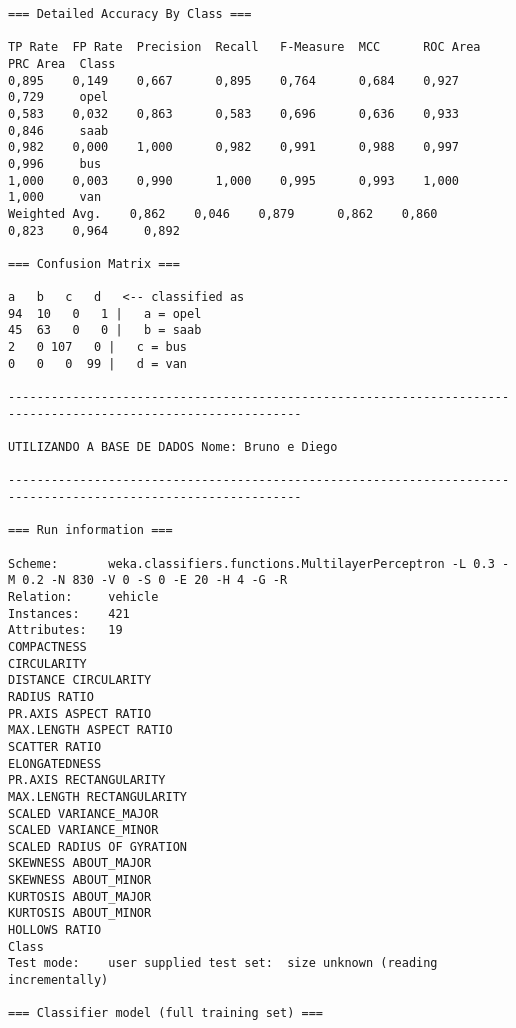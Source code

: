 \documentclass[
	article,			%
	11pt,				%
	oneside,			%
	a4paper,			%
	english,			%
	brazil,				%
	sumario=tradicional
	]{abntex2}
\begin{document}
\begin{lstlisting}
=== Detailed Accuracy By Class ===

TP Rate  FP Rate  Precision  Recall   F-Measure  MCC      ROC Area  PRC Area  Class
0,895    0,149    0,667      0,895    0,764      0,684    0,927     0,729     opel
0,583    0,032    0,863      0,583    0,696      0,636    0,933     0,846     saab
0,982    0,000    1,000      0,982    0,991      0,988    0,997     0,996     bus
1,000    0,003    0,990      1,000    0,995      0,993    1,000     1,000     van
Weighted Avg.    0,862    0,046    0,879      0,862    0,860      0,823    0,964     0,892     

=== Confusion Matrix ===

a   b   c   d   <-- classified as
94  10   0   1 |   a = opel
45  63   0   0 |   b = saab
2   0 107   0 |   c = bus
0   0   0  99 |   d = van

---------------------------------------------------------------------------------------------------------------

UTILIZANDO A BASE DE DADOS Nome: Bruno e Diego

---------------------------------------------------------------------------------------------------------------

=== Run information ===

Scheme:       weka.classifiers.functions.MultilayerPerceptron -L 0.3 -M 0.2 -N 830 -V 0 -S 0 -E 20 -H 4 -G -R
Relation:     vehicle
Instances:    421
Attributes:   19
COMPACTNESS
CIRCULARITY
DISTANCE CIRCULARITY
RADIUS RATIO
PR.AXIS ASPECT RATIO
MAX.LENGTH ASPECT RATIO
SCATTER RATIO
ELONGATEDNESS
PR.AXIS RECTANGULARITY
MAX.LENGTH RECTANGULARITY
SCALED VARIANCE_MAJOR
SCALED VARIANCE_MINOR
SCALED RADIUS OF GYRATION
SKEWNESS ABOUT_MAJOR
SKEWNESS ABOUT_MINOR
KURTOSIS ABOUT_MAJOR
KURTOSIS ABOUT_MINOR
HOLLOWS RATIO
Class
Test mode:    user supplied test set:  size unknown (reading incrementally)

=== Classifier model (full training set) ===


\end{lstlisting}
\end{document}
